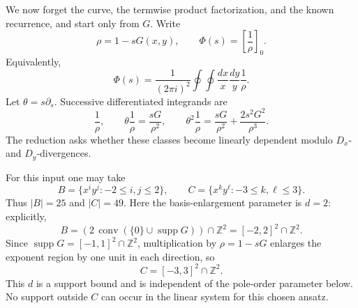 \documentclass[11pt,fleqn]{article}
\theoremstyle{plain}
\newcommand{\Dx}{D_x}
\newcommand{\Dy}{D_y}
\begin{document}
We now forget the curve, the termwise product factorization, and the known recurrence,
and start only from \(G\).  Write
\[
 \rho=1-sG(x,y),
 \qquad
 \Phi(s)=\left[\frac1\rho\right]_0.
\]
Equivalently,
\begin{equation}\label{eq:torus-period}
 \Phi(s)=\frac{1}{(2\pi i)^2}
 \oint\!\oint
 \frac{dx}{x}\frac{dy}{y}\frac1\rho .
\end{equation}
Let \(\theta=s\partial_s\).  Successive differentiated integrands are
\[
 \frac1\rho,
 \qquad
 \theta\frac1\rho=\frac{sG}{\rho^2},
 \qquad
 \theta^2\frac1\rho
 =\frac{sG}{\rho^2}+\frac{2s^2G^2}{\rho^3}.
\]
The reduction asks whether these classes become linearly dependent modulo
\(\Dx\)- and \(\Dy\)-divergences.

For this input one may take
\[
 B=\{x^iy^j:-2\le i,j\le2\},
 \qquad
 C=\{x^ky^\ell:-3\le k,\ell\le3\}.
\]
Thus \(|B|=25\) and \(|C|=49\).  Here the basis-enlargement parameter is
\(d=2\): explicitly,
\[
 B=(2\,\operatorname{conv}(\{0\}\cup\operatorname{supp}G))\cap\mathbb Z^2
   =[-2,2]^2\cap\mathbb Z^2.
\]
Since \(\operatorname{supp}G=[-1,1]^2\cap\mathbb Z^2\), multiplication by
\(\rho=1-sG\) enlarges the exponent region by one unit in each direction,
so
\[
 C=[-3,3]^2\cap\mathbb Z^2.
\]
This \(d\) is a support bound and is independent of the pole-order parameter
below.  No support outside \(C\) can occur in the linear system for this
chosen ansatz.
\end{document}
